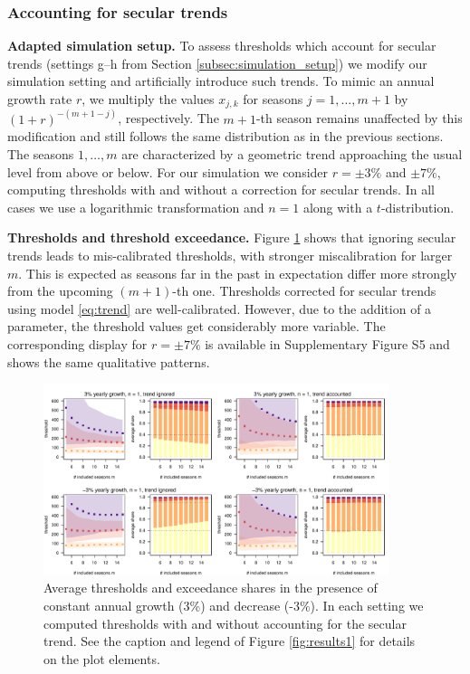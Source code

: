 \documentclass[12pt]{article}
\begin{document}
\subsubsection{Accounting for secular trends}
\label{subsec:results_trends}

\textbf{Adapted simulation setup.} To assess thresholds which account for secular trends (settings g--h from Section \ref{subsec:simulation_setup}) we modify our simulation setting and artificially introduce such trends. To mimic an annual growth rate $r$, we multiply the values $x_{j, k}$ for seasons $j = 1, \dots, m + 1$ by $(1 + r)^{-(m + 1 - j)}$, respectively. The $m + 1$-th season remains unaffected by this modification and still follows the same distribution as in the previous sections. The seasons $1, \dots, m$ are characterized by a geometric trend approaching the usual level from above or below. For our simulation we consider $r = \pm 3\%$ and $\pm 7\%$, computing thresholds with and without a correction for secular trends. In all cases we use a logarithmic transformation and $n = 1$ along with a $t$-distribution.

\noindent \textbf{Thresholds and threshold exceedance.} Figure \ref{fig:trend} shows that ignoring secular trends leads to mis-calibrated thresholds, with stronger miscalibration for larger $m$. This is expected as seasons far in the past in expectation differ more strongly from the upcoming $(m + 1)$-th one. Thresholds corrected for secular trends using model \eqref{eq:trend} are well-calibrated. However, due to the addition of a parameter, the threshold values get considerably more variable. The corresponding display for $r = \pm 7\%$ is available in Supplementary Figure S5 and shows the same qualitative patterns.

\begin{figure}
\begin{center}
\includegraphics[width = 0.9\textwidth]{figure/plot_trend3_fr_small.pdf}\vspace{-5mm}
\end{center}
\caption{Average thresholds and exceedance shares in the presence of constant annual growth (3\%) and decrease (-3\%). In each setting we computed thresholds with and without accounting for the secular trend. See the caption and legend of Figure \ref{fig:results1} for details on the plot elements.}
\label{fig:trend}
\end{figure}
\end{document}
